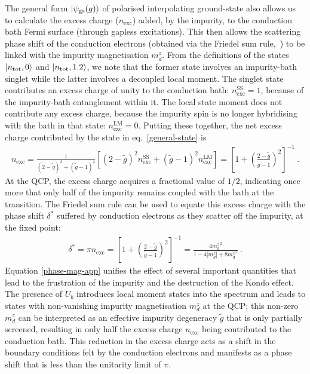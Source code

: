 The general form \(\ket{\psi_\text{gs}(g)}\) of polarised interpolating ground-state also allows us to calculate the excess charge (\(n_\text{exc}\)) added, by the impurity, to the conduction bath Fermi surface (through gapless excitations). This then allows the scattering phase shift of the conduction electrons (obtained via the Friedel sum rule,~\cite{friedel_1956,langer1961friedel,langreth1966}) to be linked with the impurity magnetisation \(m_d^z\). From the definitions of the states \(\ket{n_\text{tot},0}\) and \(\ket{n_\text{tot}, 1.2}\), we note that the former state involves an impurity-bath singlet while the latter involves a decoupled local moment. The singlet state contributes an excess charge of unity to the conduction bath: \(n_\text{exc}^\text{SS} = 1\), because of the impurity-bath entanglement within it. The local state moment does not contribute any excess charge, because the impurity spin is no longer hybridising with the bath in that state: \(n_\text{exc}^\text{LM}=0\). Putting these together, the net excess charge contributed by the state in eq.~\eqref{general-state} is
\begin{eqnarray}
	n_\text{exc} = \frac{1}{(2-\tilde g)^2 + (\tilde g-1)^2}\left[(2-\tilde g)^2 n_\text{exc}^\text{SS} + (\tilde g - 1)^2n_\text{exc}^\text{LM}\right] = \left[1 + \left(\frac{2-\tilde g}{\tilde g-1}\right)^2\right]^{-1}~.
\end{eqnarray}
At the QCP, the excess charge acquires a fractional value of \(1/2\), indicating once more that only half of the impurity remains coupled with the bath at the transition. The Friedel sum rule can be used to equate this excess charge with the phase shift \(\delta^*\) suffered by conduction electrons as they scatter off the impurity, at the fixed point:
\begin{eqnarray}\label{phase-mag-app}
	\delta^* = \pi n_\text{exc} = \left[1 + \left(\frac{2-\tilde g}{\tilde g-1}\right)^2\right]^{-1} = \frac{4{m_d^z}^2}{1 - 4|m_d^z| + 8{m_d^z}^2}~.
\end{eqnarray}
Equation \eqref{phase-mag-app} unifies the effect of several important quantities that lead to the frustration of the impurity and the destruction of the Kondo effect. The presence of \(U_b\) introduces local moment states into the spectrum and leads to states with non-vanishing impurity magnetisation \(m_d^z\) at the QCP; this non-zero \(m_d^z\) can be interpreted as an effective impurity degeneracy \(\tilde g\) that is only partially screened, resulting in only half the excess charge \(n_\text{exc}\) being contributed to the conduction bath. This reduction in the excess charge acts as a shift in the boundary conditions felt by the conduction electrons and manifests as a phase shift that is less than the unitarity limit of \(\pi\).


